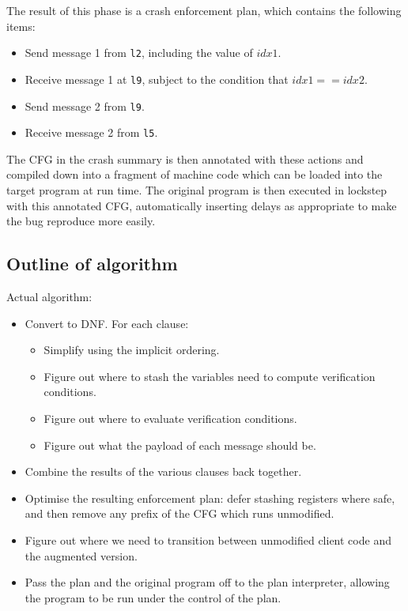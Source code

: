 

The result of this phase is a crash enforcement plan, which contains the following items:

\begin{itemize}
\item Send message 1 from \verb|l2|, including the value of $idx1$.
\item Receive message 1 at \verb|l9|, subject to the condition that $idx1 == idx2$.
\item Send message 2 from \verb|l9|.
\item Receive message 2 from \verb|l5|.
\end{itemize}

The CFG in the crash summary is then annotated with these actions and compiled down into a fragment of machine code which can be loaded into the target program at run time.
The original program is then executed in lockstep with this annotated CFG, automatically inserting delays as appropriate to make the bug reproduce more easily.

\subsection{Outline of algorithm}

Actual algorithm:

\begin{itemize}
\item
  Convert to DNF.
  For each clause:
  \begin{itemize}
  \item
    Simplify using the implicit ordering.
  \item
    Figure out where to stash the variables need to compute verification conditions.
  \item
    Figure out where to evaluate verification conditions.
  \item
    Figure out what the payload of each message should be.
  \end{itemize}
\item
  Combine the results of the various clauses back together.
\item
  Optimise the resulting enforcement plan: defer stashing registers where safe, and then remove any prefix of the CFG which runs unmodified.
\item
  Figure out where we need to transition between unmodified client code and the augmented version.
\item
  Pass the plan and the original program off to the plan interpreter, allowing the program to be run under the control of the plan.
\end{itemize}

